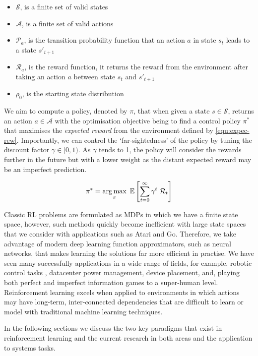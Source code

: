 \begin{itemize}
  \item $\mathcal{S}$, is a finite set of valid states
  \item $\mathcal{A}$, is a finite set of valid actions
  \item $\mathcal{P}_a$, is the transition probability function that an action $a$ in state $s_t$ leads to a state $s'_{t+1}$
  \item $\mathcal{R}_a$, is the reward function, it returns the reward from the environment after taking an action $a$ between state $s_t$ and $s'_{t+1}$
  \item $\rho_0$, is the starting state distribution
\end{itemize}

We aim to compute a policy, denoted by $\pi$, that when given a state $s \in \mathcal{S}$, returns an action $a \in \mathcal{A}$ with the optimisation objective being to find a control policy $\pi^*$ that maximises the \textit{expected reward} from the environment defined by \ref{equ:expec-rew}. Importantly, we can control the `far-sightedness' of the policy by tuning the discount factor $\gamma \in [0, 1)$. As $\gamma$ tends to 1, the policy will consider the rewards further in the future but with a lower weight as the distant expected reward may be an imperfect prediction.

\begin{equation}
  \label{equ:expec-rew}
  \pi^* = \operatorname*{arg\,max}_\pi~\mathbb{E} \left[ \sum^\infty_{t=0} \gamma^t~\mathcal{R}_t \right]
\end{equation}

Classic RL problems are formulated as MDPs in which we have a finite state space, however, such methods quickly become inefficient with large state spaces that we consider with applications such as Atari and Go. Therefore, we take advantage of modern deep learning function approximators, such as neural networks, that makes learning the solutions far more efficient in practise. We have seen many successfully applications in a wide range of fields, for example, robotic control tasks \cite{openai2019solving}, datacenter power management, device placement, and, playing both perfect and imperfect information games to a super-human level. Reinforcement learning excels when applied to environments in which actions may have long-term, inter-connected dependencies that are difficult to learn or model with traditional machine learning techniques.

In the following sections we discuss the two key paradigms that exist in reinforcement learning and the current research in both areas and the application to systems tasks.

